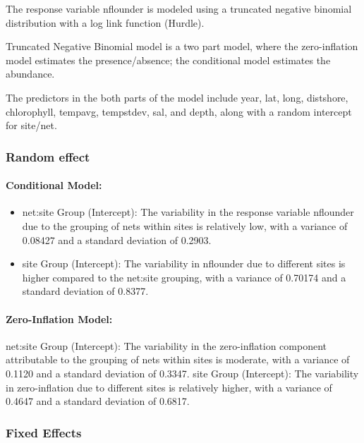 \documentclass[
]{article}
\providecommand{\tightlist}{%
  \setlength{\itemsep}{0pt}\setlength{\parskip}{0pt}}
\begin{document}
The response variable nflounder is modeled using a truncated negative
binomial distribution with a log link function (Hurdle).

Truncated Negative Binomial model is a two part model, where the
zero-inflation model estimates the presence/absence; the conditional
model estimates the abundance.

The predictors in the both parts of the model include year, lat, long,
distshore, chlorophyll, tempavg, tempstdev, sal, and depth, along with a
random intercept for site/net.

\subsubsection{Random effect}\label{random-effect}

\paragraph{Conditional Model:}\label{conditional-model}

\begin{itemize}
\tightlist
\item
  net:site Group (Intercept): The variability in the response variable
  nflounder due to the grouping of nets within sites is relatively low,
  with a variance of 0.08427 and a standard deviation of 0.2903.
\item
  site Group (Intercept): The variability in nflounder due to different
  sites is higher compared to the net:site grouping, with a variance of
  0.70174 and a standard deviation of 0.8377.
\end{itemize}

\paragraph{Zero-Inflation Model:}\label{zero-inflation-model}

net:site Group (Intercept): The variability in the zero-inflation
component attributable to the grouping of nets within sites is moderate,
with a variance of 0.1120 and a standard deviation of 0.3347. site Group
(Intercept): The variability in zero-inflation due to different sites is
relatively higher, with a variance of 0.4647 and a standard deviation of
0.6817.

\subsubsection{Fixed Effects}\label{fixed-effects}
\end{document}
